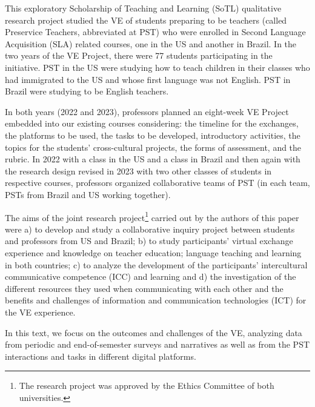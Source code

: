 This exploratory Scholarship of Teaching and Learning (SoTL) qualitative
research project \cite{stake2005qualitative} studied the VE of students preparing to
be teachers (called Preservice Teachers, abbreviated at PST) who were
enrolled in Second Language Acquisition (SLA) related courses, one in
the US and another in Brazil. In the two years of the VE Project, there
were 77 students participating in the initiative. PST in the US were
studying how to teach children in their classes who had immigrated to
the US and whose first language was not English. PST in Brazil were
studying to be English teachers.

In both years (2022 and 2023), professors planned an eight-week VE
Project embedded into our existing courses considering: the timeline for
the exchanges, the platforms to be used, the tasks to be developed,
introductory activities, the topics for the students'
cross-cultural projects, the forms of assessment, and the rubric. In
2022 with a class in the US and a class in Brazil and then again with
the research design revised in 2023 with two other classes of students
in respective courses, professors organized collaborative teams of PST
(in each team, PSTs from Brazil and US working together).

The aims of the joint research project\footnote{The research project was
	approved by the Ethics Committee of both universities.} carried out by
the authors of this paper were a) to develop and study a collaborative
inquiry project between students and professors from US and Brazil; b)
to study participants' virtual exchange experience and knowledge on
teacher education; language teaching and learning in both countries; c)
to analyze the development of the participants' intercultural
communicative competence (ICC) and learning and d) the investigation of
the different resources they used when communicating with each other and
the benefits and challenges of information and communication
technologies (ICT) for the VE experience.

In this text, we focus on the outcomes and challenges of the VE,
analyzing data from periodic and end-of-semester surveys and narratives
as well as from the PST interactions and tasks in different digital
platforms.